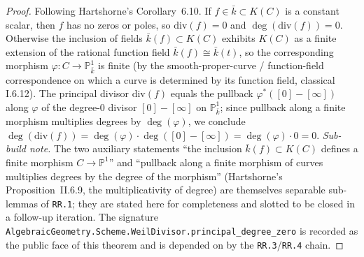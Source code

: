 \begin{proof}
  Following Hartshorne's Corollary~6.10. If \(f \in \bar k \subset K(C)\) is
  a constant scalar, then \(f\) has no zeros or poles, so \(\mathrm{div}(f) = 0\) and
  \(\deg(\mathrm{div}(f)) = 0\). Otherwise the inclusion of fields
  \(\bar k(f) \subset K(C)\) exhibits \(K(C)\) as a finite extension of the
  rational function field \(\bar k(f) \cong \bar k(t)\), so the corresponding
  morphism \(\varphi \colon C \to \mathbb P^1_{\bar k}\) is finite (by the
  smooth-proper-curve / function-field correspondence on which a curve is
  determined by its function field, classical I.6.12). The principal
  divisor \(\mathrm{div}(f)\) equals the pullback \(\varphi^{*}([0] - [\infty])\)
  along \(\varphi\) of the degree-\(0\) divisor \([0] - [\infty]\) on
  \(\mathbb P^1_{\bar k}\); since pullback along a finite morphism
  multiplies degrees by \(\deg(\varphi)\), we conclude
  $\deg(\mathrm{div}(f)) = \deg(\varphi) \cdot \deg([0] - [\infty]) = \deg(\varphi)
  \cdot 0 = 0$.
  \emph{Sub-build note.} The two auxiliary statements ``the inclusion
  \(\bar k(f) \subset K(C)\) defines a finite morphism \(C \to \mathbb P^1\)''
  and ``pullback along a finite morphism of curves multiplies degrees by
  the degree of the morphism'' (Hartshorne's Proposition~II.6.9, the
  multiplicativity of degree) are themselves separable sub-lemmas of
  \texttt{RR.1}; they are stated here for completeness and slotted to be
  closed in a follow-up iteration. The signature
  \texttt{AlgebraicGeometry.Scheme.WeilDivisor.principal\_degree\_zero}
  is recorded as the public face of this theorem and is depended on by
  the \texttt{RR.3}/\texttt{RR.4} chain.
\end{proof}
